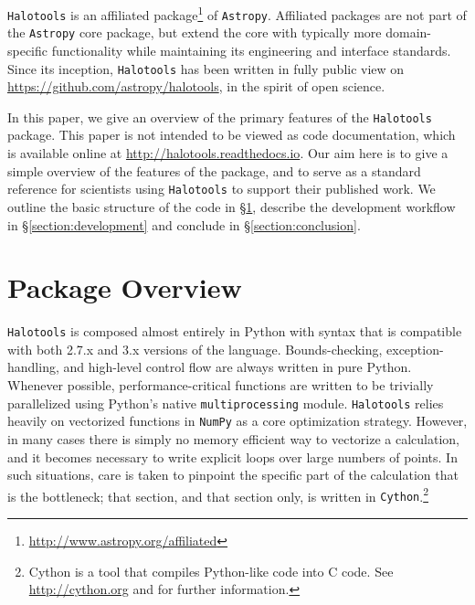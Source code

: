 \documentclass[twocolumn, tighten]{aastex6}
\begin{document}
{\tt Halotools} is an affiliated package\footnote{\url{http://www.astropy.org/affiliated}} of {\tt Astropy}. Affiliated packages are not part of the {\tt Astropy} core package, but extend the core with typically more domain-specific functionality while maintaining its engineering and interface standards. Since its inception, {\tt Halotools} has been written in fully public view on {\url{https://github.com/astropy/halotools}}, in the spirit of open science.

In this paper, we give an overview of the primary features of the {\tt Halotools} package. This paper is not intended to be viewed as code documentation, which is available online at {\url{http://halotools.readthedocs.io}}. Our aim here is to give a simple overview of the features of the package, and to serve as a standard reference for scientists using {\tt Halotools} to support their published work. We outline the basic structure of the code in \S\ref{section:overview}, describe the development workflow in \S\ref{section:development} and conclude in \S\ref{section:conclusion}.

\section{Package Overview}
\label{section:overview}

{\tt Halotools} is composed almost entirely in Python with syntax that is compatible with both 2.7.x and 3.x versions of the language. Bounds-checking, exception-handling, and high-level control flow are always written in pure Python. Whenever possible, performance-critical functions are written to be trivially parallelized using Python's native {\tt multiprocessing} module. {\tt Halotools} relies heavily on vectorized functions in {\tt NumPy} as a core optimization strategy. However, in many cases there is simply no memory efficient way to vectorize a calculation, and it becomes necessary to write explicit loops over large numbers of points. In such situations, care is taken to pinpoint the specific part of the calculation that is the bottleneck; that section, and that section only, is written in {\tt Cython}.\footnote{Cython is a tool that compiles Python-like code into C code. See \url{http://cython.org} and \citet{cython} for further information.}
\end{document}
